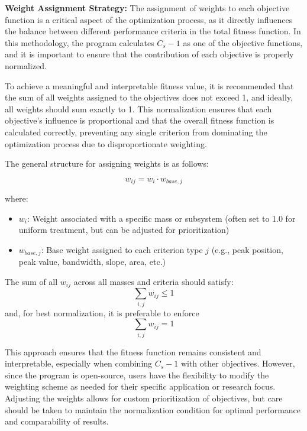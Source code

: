 \documentclass[12pt,a4paper]{article}
\begin{document}
\textbf{Weight Assignment Strategy:} The assignment of weights to each objective function is a critical aspect of the optimization process, as it directly influences the balance between different performance criteria in the total fitness function. In this methodology, the program calculates $C_s - 1$ as one of the objective functions, and it is important to ensure that the contribution of each objective is properly normalized.

To achieve a meaningful and interpretable fitness value, it is recommended that the sum of all weights assigned to the objectives does not exceed 1, and ideally, all weights should sum exactly to 1. This normalization ensures that each objective's influence is proportional and that the overall fitness function is calculated correctly, preventing any single criterion from dominating the optimization process due to disproportionate weighting.

The general structure for assigning weights is as follows:

\begin{equation}\label{Eq.weight_hierarchy_detailed}
w_{ij} = w_i \cdot w_{base,j}
\end{equation}

where:
\begin{itemize}
    \item $w_i$: Weight associated with a specific mass or subsystem (often set to 1.0 for uniform treatment, but can be adjusted for prioritization)
    \item $w_{base,j}$: Base weight assigned to each criterion type $j$ (e.g., peak position, peak value, bandwidth, slope, area, etc.)
\end{itemize}

The sum of all $w_{ij}$ across all masses and criteria should satisfy:
\begin{equation}
\sum_{i,j} w_{ij} \leq 1
\end{equation}
and, for best normalization, it is preferable to enforce
\begin{equation}
\sum_{i,j} w_{ij} = 1
\end{equation}

This approach ensures that the fitness function remains consistent and interpretable, especially when combining $C_s - 1$ with other objectives. However, since the program is open-source, users have the flexibility to modify the weighting scheme as needed for their specific application or research focus. Adjusting the weights allows for custom prioritization of objectives, but care should be taken to maintain the normalization condition for optimal performance and comparability of results.
\end{document}
